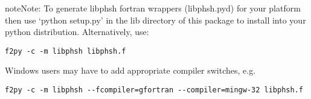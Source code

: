 \documentclass[letterpaper,10pt,english]{sphinxmanual}
\begin{document}
\begin{notice}{note}{Note:}
To generate libphsh fortran wrappers (libphsh.pyd) for your platform
then use `python setup.py' in the lib directory of this package to 
install into your python distribution. Alternatively, use:

\begin{Verbatim}[commandchars=\\\{\}]
f2py -c -m libphsh libphsh.f
\end{Verbatim}

Windows users may have to add appropriate compiler switches, e.g.

\begin{Verbatim}[commandchars=\\\{\}]
f2py -c -m libphsh --fcompiler=gfortran --compiler=mingw-32 libphsh.f
\end{Verbatim}
\end{notice}
\end{document}
